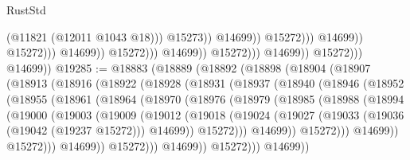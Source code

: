 \begin{lexlean}{RustStd}
\begin{coremodule}
                                                                (@11821 (@12011 @1043 @18)))
                                                              @15273))
                                                          @14699))
                                                      @15272)))
                                                @14699))
                                            @15272)))
                                      @14699))
                                  @15272)))
                            @14699))
                        @15272)))
                  @14699))
              @15272)))
        @14699))
@19285 := @18883
    (@18889
      (@18892
        (@18898
          (@18904
            (@18907
              (@18913
                (@18916
                  (@18922
                    (@18928
                      (@18931
                        (@18937
                          (@18940
                            (@18946
                              (@18952
                                (@18955
                                  (@18961
                                    (@18964
                                      (@18970
                                        (@18976
                                          (@18979
                                            (@18985
                                              (@18988
                                                (@18994
                                                  (@19000
                                                    (@19003
                                                      (@19009
                                                        (@19012
                                                          (@19018
                                                            (@19024
                                                              (@19027
                                                                (@19033
                                                                  (@19036 (@19042 (@19237 @15272)))
                                                                  @14699))
                                                              @15272)))
                                                        @14699))
                                                    @15272)))
                                              @14699))
                                          @15272)))
                                    @14699))
                                @15272)))
                          @14699))
                      @15272)))
                @14699))

\end{coremodule}
\end{lexlean}
